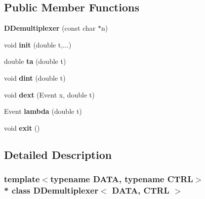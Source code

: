 \subsection*{Public Member Functions}
\begin{DoxyCompactItemize}
\item 
{\bfseries D\+Demultiplexer} (const char $\ast$n)\hypertarget{classDDemultiplexer_a1a606160a4651294450f3cdb90801cc2}{}\label{classDDemultiplexer_a1a606160a4651294450f3cdb90801cc2}

\item 
void {\bfseries init} (double t,...)\hypertarget{classDDemultiplexer_affd94405544744567f1075b1e00a7400}{}\label{classDDemultiplexer_affd94405544744567f1075b1e00a7400}

\item 
double {\bfseries ta} (double t)\hypertarget{classDDemultiplexer_af88fea43fd4c9c60eac4a87ae32fd462}{}\label{classDDemultiplexer_af88fea43fd4c9c60eac4a87ae32fd462}

\item 
void {\bfseries dint} (double t)\hypertarget{classDDemultiplexer_a448a9369afaef996d0cb2fb5bf3eba83}{}\label{classDDemultiplexer_a448a9369afaef996d0cb2fb5bf3eba83}

\item 
void {\bfseries dext} (Event x, double t)\hypertarget{classDDemultiplexer_abb60b67dbf107bf42dd9021143891f74}{}\label{classDDemultiplexer_abb60b67dbf107bf42dd9021143891f74}

\item 
Event {\bfseries lambda} (double t)\hypertarget{classDDemultiplexer_abffb4f21c0d974951df9cac90e3c9dc5}{}\label{classDDemultiplexer_abffb4f21c0d974951df9cac90e3c9dc5}

\item 
void {\bfseries exit} ()\hypertarget{classDDemultiplexer_a659a7f614d894d9288e95a4579d5e893}{}\label{classDDemultiplexer_a659a7f614d894d9288e95a4579d5e893}

\end{DoxyCompactItemize}


\subsection{Detailed Description}
\subsubsection*{template$<$typename D\+A\+TA, typename C\+T\+RL$>$\\*
class D\+Demultiplexer$<$ D\+A\+T\+A, C\+T\+R\+L $>$}

